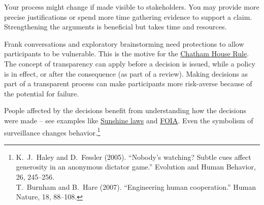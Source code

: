 Your %
process might change if made visible to stakeholders. You may provide more precise justifications or spend more time gathering evidence to support a claim. Strengthening the arguments is beneficial but takes time and resources. 

Frank conversations and exploratory brainstorming need protections to allow participants to be vulnerable. 
This is the motive for the \href{https://en.wikipedia.org/wiki/Chatham_House_Rule}{Chatham House Rule}. 
\iftoggle{WPinmargin}{\marginpar{[Wikipedia] Chatham\\House Rule}}{}
The concept of transparency can apply before a decision is issued, while a policy is in effect, or after the consequence (as part of a review). 
Making decisions as part of a transparent process can make participants more risk-averse because of the potential for failure.

People affected by the decisions benefit from understanding how the decisions were made -- see examples like 
\href{https://en.wikipedia.org/wiki/Government_in_the_Sunshine_Act}{Sunshine laws} and
\href{https://en.wikipedia.org/wiki/Freedom_of_Information_Act_(United_States)}{FOIA}. 
\iftoggle{WPinmargin}{\marginpar{[Wikipedia] Freedom\\of Information Act}}{}
Even the symbolism of surveillance changes behavior.\footnote{K.~J.~Haley and D.~Fessler (2005). ``Nobody’s watching? Subtle cues affect generosity in an anonymous dictator game.'' Evolution and Human Behavior, 26, 245–256.\\
T.~Burnham and B.~Hare (2007). ``Engineering human cooperation.'' Human Nature, 18, 88–108.}



